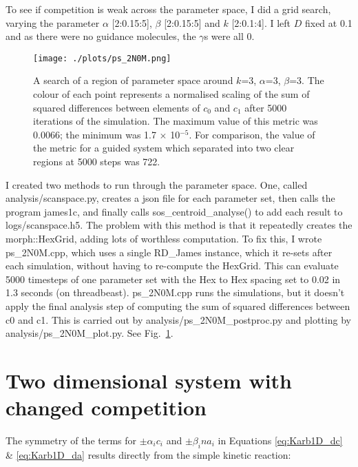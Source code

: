 \documentclass[11pt, a4paper]{article}
\newcommand{\code}[1]{\textsf{#1}}
\begin{document}
To see if competition is weak across the parameter space, I did a grid
search, varying the parameter $\alpha$ [2:0.15:5], $\beta$ [2:0.15:5]
and $k$ [2:0.1:4]. I left $D$ fixed at 0.1 and as there were no
guidance molecules, the $\gamma$s were all 0.

\begin{figure}[htb!]
\centering
\texttt{[image: ./plots/ps\_2N0M.png]}
\caption[Parameter space search.]
{A search of a region of parameter space around $k$=3, $\alpha$=3,
$\beta$=3. The colour of each point represents a normalised scaling of
the sum of squared differences between elements of $c_0$ and $c_1$
after 5000 iterations of the simulation. The maximum value of this
metric was 0.0066; the minimum was 1.7 $\times$ 10$^{-5}$. For
comparison, the value of the metric for a guided system which
separated into two clear regions at 5000 steps was 722.}
\label{fig:ps_2N0M}
\end{figure}

I created two methods to run through the parameter space. One, called
\code{analysis/scanspace.py}, creates a json file for each parameter set, then
calls the program \code{james1c}, and finally
calls \code{sos\_centroid\_analyse()} to add each result
to \code{logs/scanspace.h5}. The problem with this method is that it
repeatedly creates the \code{morph::HexGrid}, adding lots of worthless
computation. To fix this, I wrote \code{ps\_2N0M.cpp}, which uses a
single \code{RD\_James} instance, which it re-sets after each
simulation, without having to re-compute the HexGrid. This can
evaluate 5000 timesteps of one parameter set with the Hex to Hex
spacing set to 0.02 in 1.3 seconds (on
threadbeast). \code{ps\_2N0M.cpp} runs the simulations, but it doesn't
apply the final analysis step of computing the sum of squared
differences between c0 and c1. This is carried out by
\code{analysis/ps\_2N0M\_postproc.py} and plotting by
\code{analysis/ps\_2N0M\_plot.py}. See Fig.~\ref{fig:ps_2N0M}.

\section{Two dimensional system with changed competition}

The symmetry of the terms for $\pm \alpha_i c_i$ and
$\pm \beta_i n a_i$ in
Equations \ref{eq:Karb1D_dc} \& \ref{eq:Karb1D_da} results directly
from the simple kinetic reaction:
\end{document}
